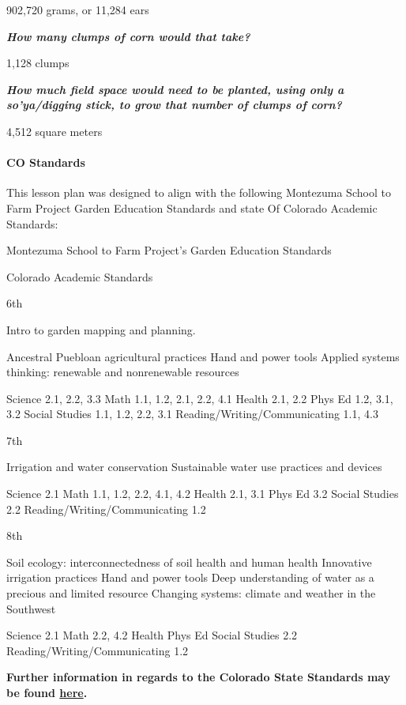 \documentclass[12pt,]{article}
\let\oldparagraph\paragraph
\renewcommand{\paragraph}[1]{\oldparagraph{#1}\mbox{}}
\begin{document}
902,720 grams, or 11,284 ears

\textbf{\emph{How many clumps of corn would that take? }}

1,128 clumps

\textbf{\emph{How much field space would need to be planted, using only a so'ya/digging stick, to grow that number of clumps of corn?} }

4,512 square meters

\hypertarget{co-standards-3}{%
\paragraph{CO Standards}\label{co-standards-3}}

This lesson plan was designed to align with the following Montezuma School to Farm Project Garden Education Standards and state Of Colorado Academic Standards:

Montezuma School to Farm Project's Garden Education Standards

Colorado Academic Standards

6th

Intro to garden mapping and planning.

Ancestral Puebloan agricultural practices
Hand and power tools
Applied systems thinking: renewable and nonrenewable resources

Science 2.1, 2.2, 3.3
Math 1.1, 1.2, 2.1, 2.2, 4.1
Health 2.1, 2.2
Phys Ed 1.2, 3.1, 3.2
Social Studies 1.1, 1.2, 2.2, 3.1
Reading/Writing/Communicating 1.1, 4.3

7th

Irrigation and water conservation
Sustainable water use practices and devices

Science 2.1
Math 1.1, 1.2, 2.2, 4.1, 4.2
Health 2.1, 3.1
Phys Ed 3.2
Social Studies 2.2
Reading/Writing/Communicating 1.2

8th

Soil ecology: interconnectedness of soil health and human health
Innovative irrigation practices
Hand and power tools
Deep understanding of water as a precious and limited resource
Changing systems: climate and weather in the Southwest

Science 2.1
Math 2.2, 4.2
Health
Phys Ed
Social Studies 2.2
Reading/Writing/Communicating 1.2

\textbf{Further information in regards to the Colorado State Standards may be found \href{http://www2.cde.state.co.us/scripts/allstandards/COStandards.asp}{here}.}
\end{document}
